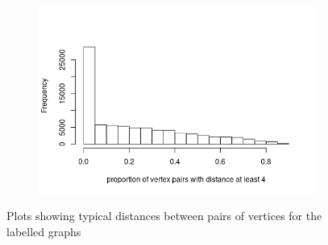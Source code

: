 \documentclass{article}
\theoremstyle{definition}
\theoremstyle{remark}
\begin{document}
\begin{figure}
\begin{subfigure}[t]{0.49\textwidth}
    \includegraphics[width=\textwidth]{mcs_prop4.png}
  \end{subfigure}
  \caption{Plots showing typical distances between pairs of vertices for the
    labelled graphs}
  \label{fig:mcs_features2}
\end{figure}
\end{document}
